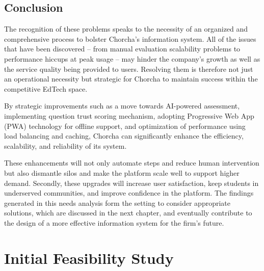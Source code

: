 \documentclass[12pt,a4paper,oneside]{book}
\begin{document}
\section{Conclusion}
The recognition of these problems speaks to the necessity of an organized and comprehensive process to bolster Chorcha's information system. All of the issues that have been discovered – from manual evaluation scalability problems to performance hiccups at peak usage – may hinder the company's growth as well as the service quality being provided to users. Resolving them is therefore not just an operational necessity but strategic for Chorcha to maintain success within the competitive EdTech space.
\begin{tcolorbox}[benefitbox, title=Strategic Enhancement Roadmap]
By strategic improvements such as a move towards AI-powered assessment, implementing question trust scoring mechanism, adopting Progressive Web App (PWA) technology for offline support, and optimization of performance using load balancing and caching, Chorcha can significantly enhance the efficiency, scalability, and reliability of its system.

These enhancements will not only automate steps and reduce human intervention but also dismantle silos and make the platform scale well to support higher demand. Secondly, these upgrades will increase user satisfaction, keep students in underserved communities, and improve confidence in the platform. The findings generated in this needs analysis form the setting to consider appropriate solutions, which are discussed in the next chapter, and eventually contribute to the design of a more effective information system for the firm's future.
\end{tcolorbox}

\newpage

\chapter{Initial Feasibility Study}
\end{document}
